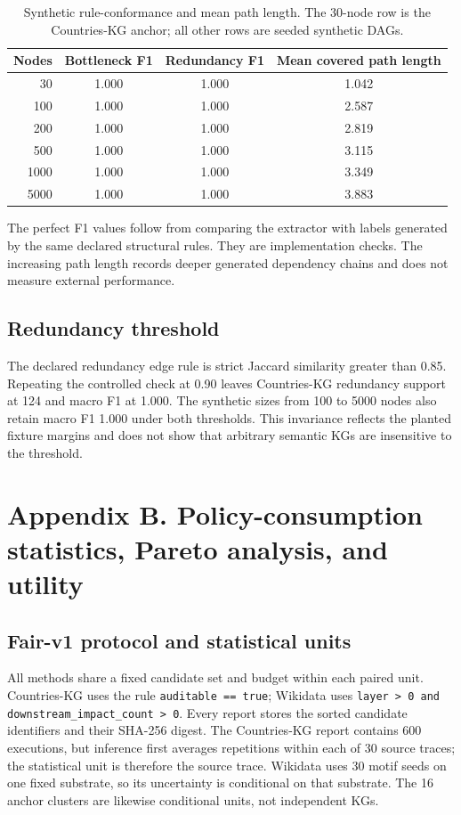 \documentclass[pdflatex,sn-basic]{sn-jnl}
\begin{document}
\begin{table}[ht]
\caption{Synthetic rule-conformance and mean path length. The 30-node row is the Countries-KG anchor; all other rows are seeded synthetic DAGs.}
\label{tab:supp-synthetic-scale}
\centering
\small
\begin{tabular}{rccc}
\toprule
Nodes & Bottleneck F1 & Redundancy F1 & Mean covered path length \\
\midrule
30 & 1.000 & 1.000 & 1.042 \\
100 & 1.000 & 1.000 & 2.587 \\
200 & 1.000 & 1.000 & 2.819 \\
500 & 1.000 & 1.000 & 3.115 \\
1000 & 1.000 & 1.000 & 3.349 \\
5000 & 1.000 & 1.000 & 3.883 \\
\bottomrule
\end{tabular}
\end{table}

The perfect F1 values follow from comparing the extractor with labels generated by the same declared structural rules. They are implementation checks. The increasing path length records deeper generated dependency chains and does not measure external performance.

\subsection{Redundancy threshold}

The declared redundancy edge rule is strict Jaccard similarity greater than 0.85. Repeating the controlled check at 0.90 leaves Countries-KG redundancy support at 124 and macro F1 at 1.000. The synthetic sizes from 100 to 5000 nodes also retain macro F1 1.000 under both thresholds. This invariance reflects the planted fixture margins and does not show that arbitrary semantic KGs are insensitive to the threshold.

\section{Appendix B. Policy-consumption statistics, Pareto analysis, and utility}
\label{app:policy-statistics}

\subsection{Fair-v1 protocol and statistical units}

All methods share a fixed candidate set and budget within each paired unit. Countries-KG uses the rule \texttt{auditable == true}; Wikidata uses \texttt{layer > 0 and downstream\_impact\_count > 0}. Every report stores the sorted candidate identifiers and their SHA-256 digest. The Countries-KG report contains 600 executions, but inference first averages repetitions within each of 30 source traces; the statistical unit is therefore the source trace. Wikidata uses 30 motif seeds on one fixed substrate, so its uncertainty is conditional on that substrate. The 16 anchor clusters are likewise conditional units, not independent KGs.
\end{document}
